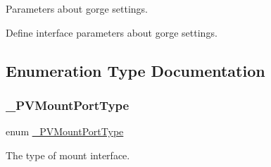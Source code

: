 Parameters about gorge settings. 

Define interface parameters about gorge settings. 

\subsection{Enumeration Type Documentation}
\mbox{\label{group___p_v_s_d_k___c_o_r_e___a_p_i___m_o_u_n_t_c_o_n_t_r_o_l_ga67965dabe94c922db72b3ad1f4113b27}} 
\subsubsection{\texorpdfstring{\+\_\+\+P\+V\+Mount\+Port\+Type}{\_PVMountPortType}}
{\footnotesize\ttfamily enum \hyperlink{group___p_v_s_d_k___c_o_r_e___a_p_i___m_o_u_n_t_c_o_n_t_r_o_l_ga67965dabe94c922db72b3ad1f4113b27}{\+\_\+\+P\+V\+Mount\+Port\+Type}}



The type of mount interface. 

